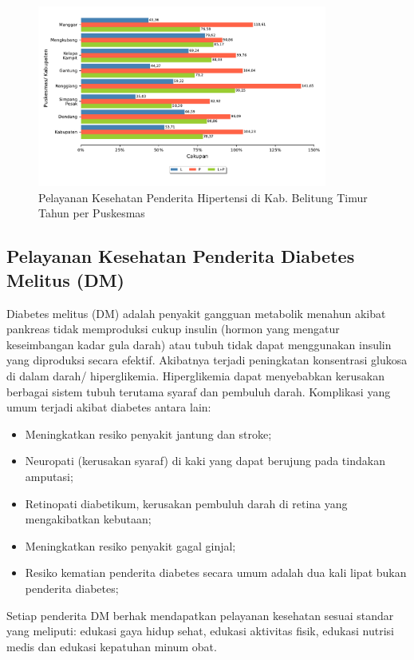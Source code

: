 \begin{figure}[H]
  \centering
  \includegraphics[width=0.85\textwidth]{bab_06/bab_06_13_hipertensi}
  \caption{Pelayanan Kesehatan Penderita Hipertensi di Kab. Belitung Timur Tahun \tP per Puskesmas}
  \label{fig:Pelayanan-Hipertensi}
\end{figure}

\subsection{Pelayanan Kesehatan Penderita Diabetes Melitus (DM)}
Diabetes melitus (DM) adalah penyakit gangguan metabolik menahun akibat pankreas tidak memproduksi cukup insulin (hormon yang mengatur keseimbangan kadar gula darah) atau tubuh tidak dapat menggunakan insulin yang diproduksi secara efektif.
Akibatnya terjadi peningkatan konsentrasi glukosa di dalam darah/ hiperglikemia. 
Hiperglikemia dapat menyebabkan kerusakan berbagai sistem tubuh terutama syaraf dan pembuluh darah. Komplikasi yang umum terjadi akibat diabetes antara lain:
\begin{itemize}
  \item Meningkatkan resiko penyakit jantung dan stroke;
  \item Neuropati (kerusakan syaraf) di kaki yang dapat berujung pada tindakan amputasi;
  \item Retinopati diabetikum, kerusakan pembuluh darah di retina yang mengakibatkan kebutaan;
  \item Meningkatkan resiko penyakit gagal ginjal;
  \item Resiko kematian penderita diabetes secara umum adalah dua kali lipat bukan penderita diabetes;
\end{itemize}
Setiap penderita DM berhak mendapatkan pelayanan kesehatan sesuai standar yang meliputi: edukasi gaya hidup sehat, edukasi aktivitas fisik, edukasi nutrisi medis dan edukasi kepatuhan minum obat.

